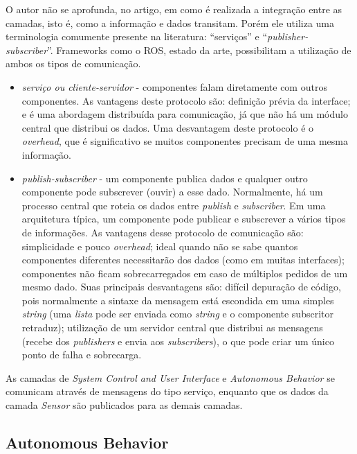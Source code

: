 O autor não se aprofunda, no artigo, em como é realizada a integração entre as
camadas, isto é, como a informação e dados transitam. Porém ele utiliza
uma terminologia comumente presente na literatura: ``serviços'' e
``\textit{publisher-subscriber}''. Frameworks como o ROS, estado da arte,
possibilitam a utilização de ambos os tipos de comunicação.

\begin{itemize}
  \item \textit{serviço ou cliente-servidor} -  componentes falam diretamente
  com outros componentes. As vantagens deste protocolo são: definição prévia da
  interface; e é uma abordagem distribuída para comunicação, já que não há um
  módulo central que distribui os dados. Uma desvantagem deste protocolo é o
  \textit{overhead}, que é significativo se muitos componentes precisam de uma
  mesma informação.

  \item \textit{publish-subscriber} - um componente publica dados e qualquer outro componente
pode subscrever (ouvir) a esse dado. Normalmente, há um processo central que
roteia os dados entre \textit{publish} e \textit{subscriber}. Em uma arquitetura
típica, um componente pode publicar e subscrever a vários tipos de informações.
As vantagens desse protocolo de comunicação são: simplicidade e pouco
\textit{overhead}; ideal quando não se sabe quantos componentes diferentes
necessitarão dos dados (como em muitas interfaces); componentes não ficam
sobrecarregados em caso de múltiplos pedidos de um mesmo dado. Suas principais
desvantagens são: difícil depuração de código, pois normalmente a sintaxe da
mensagem está escondida em uma simples \textit{string} (uma \textit{lista}
pode ser enviada como \textit{string} e o componente subscritor retraduz);
utilização de um servidor central que distribui as mensagens (recebe dos
\textit{publishers} e envia aos \textit{subscribers}), o que pode criar um único
ponto de falha e sobrecarga.

\end{itemize}

As camadas de \textit{System Control and User Interface} e \textit{Autonomous
Behavior} se comunicam através de mensagens do tipo serviço, enquanto que os
dados da camada \textit{Sensor} são publicados para as demais camadas.

\subsection{Autonomous Behavior}

